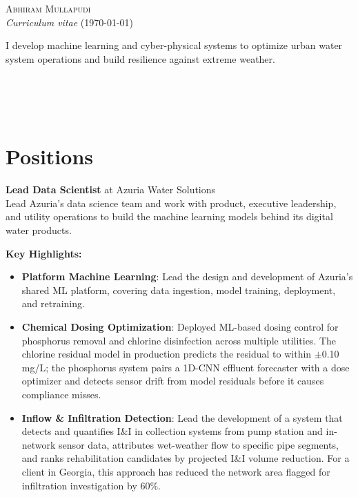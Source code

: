 \documentclass[a4paper,11pt]{article}
\newcommand{\years}[1]{%
  {\reversemarginpar\strut\marginnote{{\small#1}}}%
}
\begin{document}
{\huge \textsc{Abhiram Mullapudi}}\\
{\small \textit{Curriculum vitae} (\today)}\\

\begin{vwcol}[widths={0.78,0.22}]
{\footnotesize I develop machine learning and cyber-physical systems to optimize urban water system operations and build resilience against extreme weather.}

\vfill\eject

{\scriptsize {\noindent
{\faEnvelope{}}\\
{\faHome{}}\\
{\faGithub{}}\\}}
\end{vwcol}

\vspace{-5mm}
\section*{Positions}

\years{2025--}%
\noindent\textbf{Lead Data Scientist} at Azuria Water Solutions\\[0.1cm]
Lead Azuria's data science team and work with product, executive leadership, and utility operations to build the machine learning models behind its digital water products.

\vspace{2mm}


{\small \textbf{Key Highlights:}}
\vspace{-2mm}
\begin{itemize}
	\setlength\itemsep{1mm}
	\item \textbf{Platform Machine Learning}: Lead the design and development of Azuria's shared ML platform, covering data ingestion, model training, deployment, and retraining.
	\item \textbf{Chemical Dosing Optimization}: Deployed ML-based dosing control for phosphorus removal and chlorine disinfection across multiple utilities. The chlorine residual model in production predicts the residual to within $\pm$0.10 mg/L; the phosphorus system pairs a 1D-CNN effluent forecaster with a dose optimizer and detects sensor drift from model residuals before it causes compliance misses.
	\item \textbf{Inflow \& Infiltration Detection}: Lead the development of a system that detects and quantifies I\&I in collection systems from pump station and in-network sensor data, attributes wet-weather flow to specific pipe segments, and ranks rehabilitation candidates by projected I\&I volume reduction. For a client in Georgia, this approach has reduced the network area flagged for infiltration investigation by 60\%.
\end{itemize}
\end{document}
